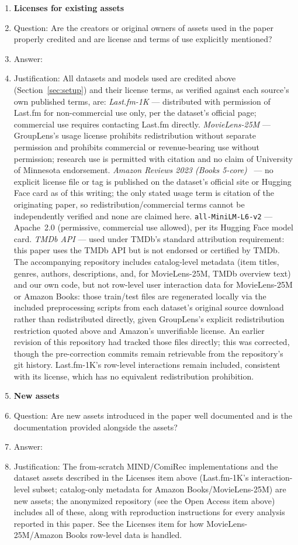 \documentclass{article}
\begin{document}
\begin{enumerate}
\item {\bf Licenses for existing assets}
    \item[] Question: Are the creators or original owners of assets used in the paper properly credited and are license and terms of use explicitly mentioned?
    \item[] Answer: \answerYes{}
    \item[] Justification: All datasets and models used are credited above (Section~\ref{sec:setup}) and their license terms, as verified against each source's own published terms, are: \emph{Last.fm-1K} --- distributed with permission of Last.fm for non-commercial use only, per the dataset's official page; commercial use requires contacting Last.fm directly. \emph{MovieLens-25M} --- GroupLens's usage license prohibits redistribution without separate permission and prohibits commercial or revenue-bearing use without permission; research use is permitted with citation and no claim of University of Minnesota endorsement. \emph{Amazon Reviews 2023 (Books 5-core)}~\cite{hou2024} --- no explicit license file or tag is published on the dataset's official site or Hugging Face card as of this writing; the only stated usage term is citation of the originating paper, so redistribution/commercial terms cannot be independently verified and none are claimed here. \texttt{all-MiniLM-L6-v2} --- Apache~2.0 (permissive, commercial use allowed), per its Hugging Face model card. \emph{TMDb API} --- used under TMDb's standard attribution requirement: this paper uses the TMDb API but is not endorsed or certified by TMDb. The accompanying repository includes catalog-level metadata (item titles, genres, authors, descriptions, and, for MovieLens-25M, TMDb overview text) and our own code, but not row-level user interaction data for MovieLens-25M or Amazon Books: those train/test files are regenerated locally via the included preprocessing scripts from each dataset's original source download rather than redistributed directly, given GroupLens's explicit redistribution restriction quoted above and Amazon's unverifiable license. An earlier revision of this repository had tracked those files directly; this was corrected, though the pre-correction commits remain retrievable from the repository's git history. Last.fm-1K's row-level interactions remain included, consistent with its license, which has no equivalent redistribution prohibition.

\item {\bf New assets}
    \item[] Question: Are new assets introduced in the paper well documented and is the documentation provided alongside the assets?
    \item[] Answer: \answerYes{}
    \item[] Justification: The from-scratch MIND/ComiRec implementations and the dataset assets described in the Licenses item above (Last.fm-1K's interaction-level subset; catalog-only metadata for Amazon Books/MovieLens-25M) are new assets; the anonymized repository (see the Open Access item above) includes all of these, along with reproduction instructions for every analysis reported in this paper. See the Licenses item for how MovieLens-25M/Amazon Books row-level data is handled.


\end{enumerate}
\end{document}
